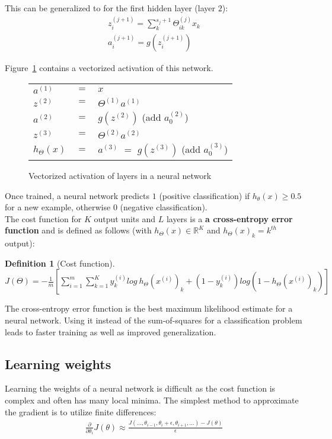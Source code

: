 \documentclass{report}
\newtheorem{definition}{Definition}[section]
\begin{document}
This can be generalized to for the first hidden layer (layer $2$):
\begin{align*}
z_i^{(j+1)} = \sum_k^{s_{j}+1} \Theta_{ik}^{(j)}x_k \\
a_i^{(j+1)} = g(z_i^{(j+1)})
\end{align*}

Figure~\ref{ref:neuralnetworkmappingvectorized} contains a vectorized activation of this network. \\

\begin{figure}[h!]
\centering
\begin{tabular}{lcl}
$a^{(1)}$ & $=$ & $x$ \\
$z^{(2)}$ & $=$ & $\Theta^{(1)}a^{(1)}$ \\
$a^{(2)}$ & $=$ & $g(z^{(2)})$ (add $a_0^{(2)}$) \\
$z^{(3)}$ & $=$ & $\Theta^{(2)}a^{(2)}$ \\
$h_{\Theta}(x)$ & $=$ & $a^{(3)}$ $=$ $g(z^{(3)})$ (add $a_0^{(3)}$) \\
\end{tabular}
\caption{Vectorized activation of layers in a neural network}
\label{ref:neuralnetworkmappingvectorized}
\end{figure}

Once trained, a neural network predicts $1$ (positive classification) if $h_\theta(x) \ge 0.5$ for a new example, otherwise $0$ (negative classification). \\

The cost function for $K$ output units and $L$ layers is a {\bf a cross-entropy error function} and is defined as follows (with $h_\Theta(x) \in \mathbb{R}^K$ and $h_\Theta(x)_k = k^{th}$ output):

\begin{definition}[Cost function] ~\\
$J(\Theta) = -\frac{1}{m}[\sum_{i=1}^m \sum_{k=1}^K y_k^{(i)}log\:h_{\Theta}(x^{(i)})_k+(1-y_k^{(i)})log(1-h_{\Theta}(x^{(i)})_k)]$
\end{definition}


The cross-entropy error function is the best maximum likelihood estimate for a neural network.
Using it instead of the sum-of-squares for a classification problem leads to faster training as well as improved generalization.


\subsection{Learning weights}
\label{chapter:learningweights}
Learning the weights of a neural network is difficult as the cost function is complex and often has many local minima.
The simplest method to approximate the gradient is to utilize finite differences:
\begin{align*}
\frac{\partial}{\partial\theta_i}J(\theta)\approx\frac{J(...,\theta_{i-1},\theta_{i}+\epsilon,\theta_{i+1},...)-J(\theta)}{\epsilon}
\end{align*}
\end{document}
